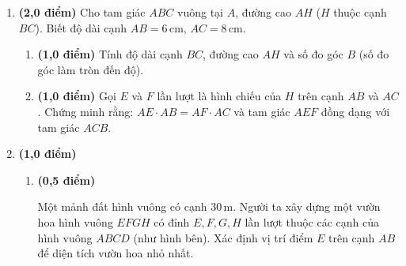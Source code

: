 \documentclass[12pt,a4paper]{article}
\begin{document}
\begin{enumerate}[label=\textbf{Câu \arabic*.}, leftmargin=*, itemsep=4pt, parsep=0pt, start=9]
\begin{minipage}[t]{0.30\linewidth}
  \end{minipage}

  \item \textbf{(2,0 điểm)} Cho tam giác $ABC$ vuông tại $A$, đường cao $AH$ ($H$ thuộc cạnh $BC$). Biết độ dài cạnh $AB = 6\,\text{cm}$, $AC = 8\,\text{cm}$.
  \begin{enumerate}[label=\alph*), leftmargin=20pt, itemsep=2pt]
    \item \textbf{(1,0 điểm)} Tính độ dài cạnh $BC$, đường cao $AH$ và số đo góc $B$ (số đo góc làm tròn đến độ).
    \item \textbf{(1,0 điểm)} Gọi $E$ và $F$ lần lượt là hình chiếu của $H$ trên cạnh $AB$ và $AC$. Chứng minh rằng: $AE \cdot AB = AF \cdot AC$ và tam giác $AEF$ đồng dạng với tam giác $ACB$.
  \end{enumerate}

  \item \textbf{(1,0 điểm)}
  \begin{enumerate}[label=\alph*), leftmargin=20pt, itemsep=2pt]
    \item \textbf{(0,5 điểm)} 
    \par\noindent
    \begin{minipage}[t]{0.70\linewidth}
      Một mảnh đất hình vuông có cạnh $30\,\text{m}$. Người ta xây dựng một vườn hoa hình vuông $EFGH$ có đỉnh $E, F, G, H$ lần lượt thuộc các cạnh của hình vuông $ABCD$ (như hình bên). Xác định vị trí điểm $E$ trên cạnh $AB$ để diện tích vườn hoa nhỏ nhất.
    \end{minipage}\hfill
    \begin{minipage}[t]{0.28\linewidth}
      \vspace{-2mm}
      \centering
\end{minipage}
\end{enumerate}
\end{enumerate}
\end{document}

